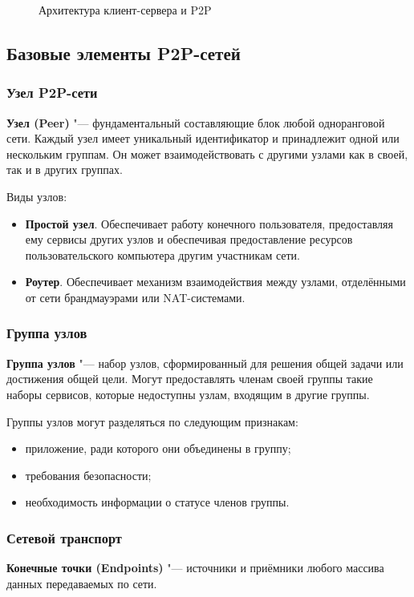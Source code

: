 \documentclass[bachelor, och, coursework]{SCWorks}
\begin{document}
\begin{figure}[h]
\begin{minipage}[h]{0.49\linewidth}
    \end{minipage}
    \caption{Архитектура клиент-сервера и P2P}
    \label{ris:image1}
\end{figure}

\subsection{Базовые элементы P2P-сетей}
\subsubsection{Узел P2P-сети}
\textbf{Узел (Peer)} "--- фундаментальный составляющие блок любой одноранговой сети. 
Каждый узел имеет уникальный идентификатор и принадлежит одной или нескольким группам. 
Он может взаимодействовать с другими узлами как в своей, так и в других группах. \cite{P2P_2}

Виды узлов:
\begin{itemize}
    \item \textbf{Простой узел}. Обеспечивает работу конечного пользователя, предоставляя ему сервисы других узлов и	
    обеспечивая предоставление ресурсов пользовательского компьютера другим	участникам сети.
    \item \textbf{Роутер}. Обеспечивает механизм взаимодействия между узлами, отделёнными от сети брандмауэрами или NAT-системами.	
\end{itemize}

\subsubsection{Группа узлов}
\textbf{Группа узлов} "--- набор узлов, сформированный для решения общей задачи или достижения общей цели. 
Могут предоставлять членам своей группы такие наборы сервисов, которые недоступны узлам, входящим в другие группы.

Группы узлов могут разделяться по следующим признакам:
\begin{itemize}
    \item приложение, ради которого они объединены в группу;
    \item требования безопасности;
    \item необходимость информации о статусе членов группы.
\end{itemize}

\subsubsection{Сетевой транспорт}
\textbf{Конечные точки (Endpoints)} "--- источники и приёмники любого массива данных передаваемых по сети.
\end{document}
